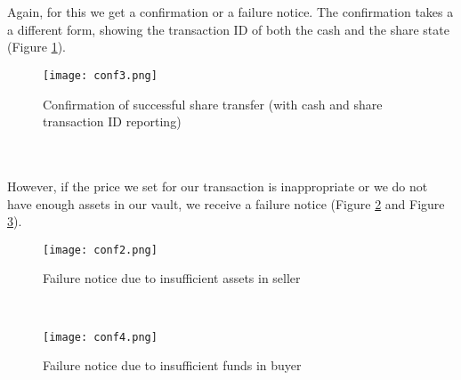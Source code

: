 \documentclass[12pt,twoside]{article}
\begin{document}
\\ \\
Again, for this we get a confirmation or a failure notice. The confirmation takes a a different form, showing the transaction ID of both the cash and the share state (Figure \ref{fig:conf3}). 
\begin{figure}[!htb]
\centering
\texttt{[image: conf3.png]}
\caption{Confirmation of successful share transfer (with cash and share transaction ID reporting)}
\centering
\label{fig:conf3}
\end{figure}
\\ \\
However, if the price we set for our transaction is inappropriate or we do not have enough assets in our vault, we receive a failure notice (Figure \ref{fig:conf2} and Figure \ref{fig:conf4}).
\begin{figure}[!htb]
\centering
\texttt{[image: conf2.png]}
\caption{Failure notice due to insufficient assets in seller}
\centering
\label{fig:conf2}
\end{figure}
\\ 
\begin{figure}[!htb]
\centering
\texttt{[image: conf4.png]}
\caption{Failure notice due to insufficient funds in buyer}
\centering
\label{fig:conf4}
\end{figure}
\end{document}
